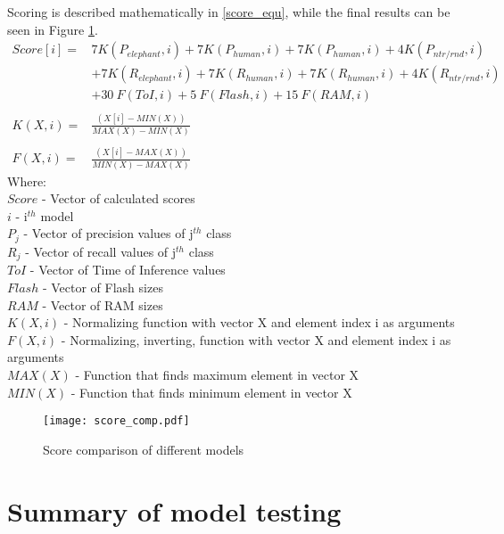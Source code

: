Scoring is described mathematically in \ref{score_equ}, while the final results can be seen in Figure \ref{score_comp}.
\begin{equation}\label{score_equ}
    \begin{aligned}
        Score[i] ={} & 7 K(P_{elephant},i) + 7 K(P_{human},i) + 7 K(P_{human},i) + 4 K(P_{ntr/rnd},i) \\
                     & +{} 7 K(R_{elephant},i) + 7 K(R_{human},i) + 7 K(R_{human},i) + 4 K(R_{ntr/rnd},i) \\
                  & +{} 30\: F(ToI, i) +5\: F(Flash, i) + 15\: F(RAM, i)   \\
                  & \\
        K(X, i) ={}  & \frac{(X[i] - MIN(X))}{MAX(X)- MIN(X)} \\
                  & \\
        F(X, i) ={}  & \frac{(X[i] - MAX(X))}{MIN(X)- MAX(X)}
    \end{aligned}
\end{equation}
\clearpage
Where:\\
$Score$ - Vector of calculated scores\\
$i$ - i$^{th}$ model\\
$P_{j}$ - Vector of precision values of j$^{th}$ class\\
$R_{j}$ - Vector of recall values of j$^{th}$ class\\
$ToI$ - Vector of Time of Inference values\\
$Flash$ - Vector of Flash sizes\\
$RAM$ - Vector of RAM sizes\\
$K(X,i)$ - Normalizing function with vector X and element index i as arguments\\
$F(X,i)$ - Normalizing, inverting, function with vector X and element index i as arguments\\
$MAX(X)$ - Function that finds maximum element in vector X\\
$MIN(X)$ - Function that finds minimum element in vector X

\begin{figure}[ht]
    \centering
    \texttt{[image: score\_comp.pdf]}
    \caption{ Score comparison of different models}
    \label{score_comp}
\end{figure}

\section{ Summary of model testing}

